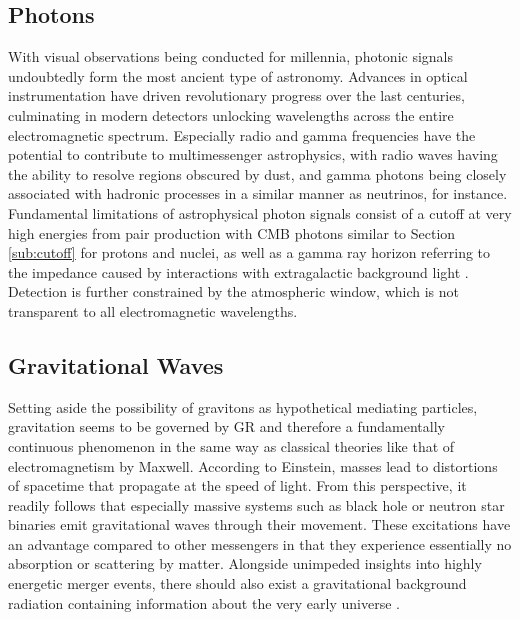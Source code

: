 \subsection{Photons}
\label{sub:photons}

With visual observations being conducted for millennia, photonic signals undoubtedly form the most ancient type of astronomy.
Advances in optical instrumentation have driven revolutionary progress over the last centuries, culminating in modern detectors
unlocking wavelengths across the entire electromagnetic spectrum. Especially radio and gamma frequencies have the potential to
contribute to multimessenger astrophysics, with radio waves having the ability to resolve regions obscured by dust, and gamma
photons being closely associated with hadronic processes in a similar manner as neutrinos, for instance. Fundamental limitations
of astrophysical photon signals consist of a cutoff at very high energies from pair production with CMB photons similar to
Section \ref{sub:cutoff} for protons and nuclei, as well as a gamma ray horizon referring to the impedance caused by
interactions with extragalactic background light \cite{Dominguez_2013}. Detection is further constrained by the atmospheric
window, which is not transparent to all electromagnetic wavelengths.



\subsection{Gravitational Waves}
\label{sub:gravitational}

Setting aside the possibility of gravitons as hypothetical mediating particles, gravitation seems to be governed by GR and therefore
a fundamentally continuous phenomenon in the same way as classical theories like that of electromagnetism by Maxwell. According to
Einstein, masses lead to distortions of spacetime that propagate at the speed of light. From this perspective, it readily follows that
especially massive systems such as black hole or neutron star binaries emit gravitational waves through their movement. These excitations
have an advantage compared to other messengers in that they experience essentially no absorption or scattering by matter. Alongside
unimpeded insights into highly energetic merger events, there should also exist a gravitational background radiation containing
information about the very early universe \cite{Meszaros_2019}.


\newpage


